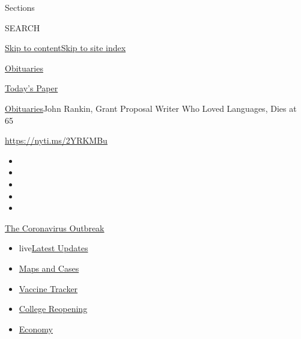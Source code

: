 Sections

SEARCH

\protect\hyperlink{site-content}{Skip to
content}\protect\hyperlink{site-index}{Skip to site index}

\href{https://www.nytimes.com/section/obituaries}{Obituaries}

\href{https://myaccount.nytimes.com/auth/login?response_type=cookie\&client_id=vi}{}

\href{https://www.nytimes.com/section/todayspaper}{Today's Paper}

\href{/section/obituaries}{Obituaries}\textbar{}John Rankin, Grant
Proposal Writer Who Loved Languages, Dies at 65

\url{https://nyti.ms/2YRKMBu}

\begin{itemize}
\item
\item
\item
\item
\item
\end{itemize}

\href{https://www.nytimes.com/news-event/coronavirus?action=click\&pgtype=Article\&state=default\&region=TOP_BANNER\&context=storylines_menu}{The
Coronavirus Outbreak}

\begin{itemize}
\tightlist
\item
  live\href{https://www.nytimes.com/2020/08/03/world/coronavirus-covid-19.html?action=click\&pgtype=Article\&state=default\&region=TOP_BANNER\&context=storylines_menu}{Latest
  Updates}
\item
  \href{https://www.nytimes.com/interactive/2020/us/coronavirus-us-cases.html?action=click\&pgtype=Article\&state=default\&region=TOP_BANNER\&context=storylines_menu}{Maps
  and Cases}
\item
  \href{https://www.nytimes.com/interactive/2020/science/coronavirus-vaccine-tracker.html?action=click\&pgtype=Article\&state=default\&region=TOP_BANNER\&context=storylines_menu}{Vaccine
  Tracker}
\item
  \href{https://www.nytimes.com/2020/08/02/us/covid-college-reopening.html?action=click\&pgtype=Article\&state=default\&region=TOP_BANNER\&context=storylines_menu}{College
  Reopening}
\item
  \href{https://www.nytimes.com/live/2020/08/03/business/stock-market-today-coronavirus?action=click\&pgtype=Article\&state=default\&region=TOP_BANNER\&context=storylines_menu}{Economy}
\end{itemize}

